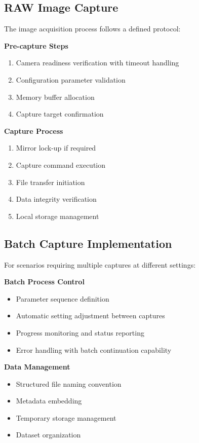 \subsection{RAW Image Capture}
The image acquisition process follows a defined protocol:

\textbf{Pre-capture Steps}
\begin{enumerate}
    \item Camera readiness verification with timeout handling
    \item Configuration parameter validation
    \item Memory buffer allocation
    \item Capture target confirmation
\end{enumerate}

\textbf{Capture Process}
\begin{enumerate}
    \item Mirror lock-up if required
    \item Capture command execution
    \item File transfer initiation
    \item Data integrity verification
    \item Local storage management
\end{enumerate}

\subsection{Batch Capture Implementation}
For scenarios requiring multiple captures at different settings:

\textbf{Batch Process Control}
\begin{itemize}
    \item Parameter sequence definition
    \item Automatic setting adjustment between captures
    \item Progress monitoring and status reporting
    \item Error handling with batch continuation capability
\end{itemize}

\textbf{Data Management}
\begin{itemize}
    \item Structured file naming convention
    \item Metadata embedding
    \item Temporary storage management
    \item Dataset organization
\end{itemize}

